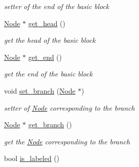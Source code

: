 \begin{DoxyCompactItemize}
\begin{DoxyCompactList}\small\item\em setter of the end of the basic block \end{DoxyCompactList}\item 
\hypertarget{class_basic__block_ac317495c3e84de7431562490dcedff9e}{\hyperlink{class_node}{Node} $\ast$ \hyperlink{class_basic__block_ac317495c3e84de7431562490dcedff9e}{get\-\_\-head} ()}\label{class_basic__block_ac317495c3e84de7431562490dcedff9e}

\begin{DoxyCompactList}\small\item\em get the head of the basic block \end{DoxyCompactList}\item 
\hypertarget{class_basic__block_ae914e0179d58835b213bad613bfbaf40}{\hyperlink{class_node}{Node} $\ast$ \hyperlink{class_basic__block_ae914e0179d58835b213bad613bfbaf40}{get\-\_\-end} ()}\label{class_basic__block_ae914e0179d58835b213bad613bfbaf40}

\begin{DoxyCompactList}\small\item\em get the end of the basic block \end{DoxyCompactList}\item 
\hypertarget{class_basic__block_a4930bdd8a990cfb2d10f39087306a75e}{void \hyperlink{class_basic__block_a4930bdd8a990cfb2d10f39087306a75e}{set\-\_\-branch} (\hyperlink{class_node}{Node} $\ast$)}\label{class_basic__block_a4930bdd8a990cfb2d10f39087306a75e}

\begin{DoxyCompactList}\small\item\em setter of \hyperlink{class_node}{Node} corresponding to the branch \end{DoxyCompactList}\item 
\hypertarget{class_basic__block_a5015a11dd64de82b6480a86ded7d720b}{\hyperlink{class_node}{Node} $\ast$ \hyperlink{class_basic__block_a5015a11dd64de82b6480a86ded7d720b}{get\-\_\-branch} ()}\label{class_basic__block_a5015a11dd64de82b6480a86ded7d720b}

\begin{DoxyCompactList}\small\item\em get the \hyperlink{class_node}{Node} corresponding to the branch \end{DoxyCompactList}\item 
\hypertarget{class_basic__block_a94840ac976b27d9024f4c04efb276ac1}{bool \hyperlink{class_basic__block_a94840ac976b27d9024f4c04efb276ac1}{is\-\_\-labeled} ()}\label{class_basic__block_a94840ac976b27d9024f4c04efb276ac1}


\end{DoxyCompactItemize}
